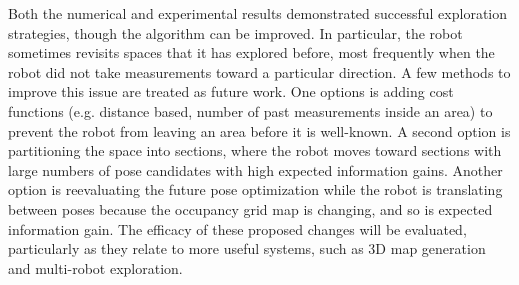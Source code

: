 \documentclass[smallextended]{svjour3}       %
\begin{document}
Both the numerical and experimental results demonstrated successful exploration strategies, though the algorithm can be improved. In particular, the robot sometimes revisits spaces that it has explored before, most frequently when the robot did not take measurements toward a particular direction. A few methods to improve this issue are treated as future work. One options is adding cost functions (e.g. distance based, number of past measurements inside an area) to prevent the robot from leaving an area before it is well-known. A second option is partitioning the space into sections, where the robot moves toward sections with large numbers of pose candidates with high expected information gains. Another option is reevaluating the future pose optimization while the robot is translating between poses because the occupancy grid map is changing, and so is expected information gain. The efficacy of these proposed changes will be evaluated, particularly as they relate to more useful systems, such as 3D map generation and multi-robot exploration.

\end{document}
